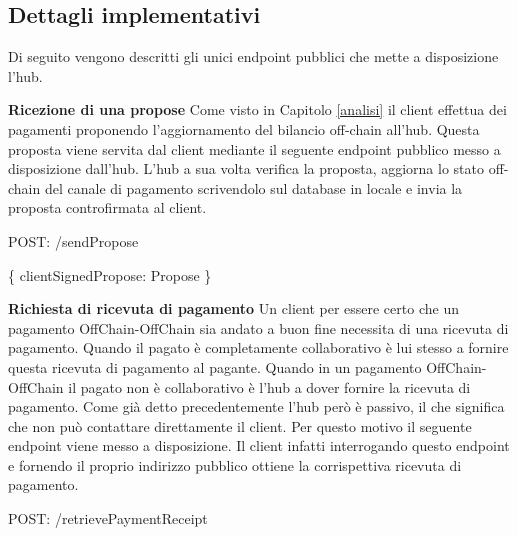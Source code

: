 \documentclass[12pt,italian,]{book}
\newenvironment{Shaded}{}{}
\newcommand{\DataTypeTok}[1]{\textcolor[rgb]{0.56,0.13,0.00}{#1}}
\newcommand{\NormalTok}[1]{#1}
\newcommand{\OperatorTok}[1]{\textcolor[rgb]{0.40,0.40,0.40}{#1}}
\newcommand{\SpecialStringTok}[1]{\textcolor[rgb]{0.73,0.40,0.53}{#1}}
\begin{document}
\hypertarget{dettagli-implementativi-2}{%
\subsection{Dettagli implementativi}\label{dettagli-implementativi-2}}

Di seguito vengono descritti gli unici endpoint pubblici che mette a disposizione l'hub.

\textbf{\textbf{Ricezione di una propose}} Come visto in Capitolo \ref{analisi} il client effettua dei pagamenti proponendo l'aggiornamento del bilancio off-chain all'hub. Questa proposta viene servita dal client mediante il seguente endpoint pubblico messo a disposizione dall'hub. L'hub a sua volta verifica la proposta, aggiorna lo stato off-chain del canale di pagamento scrivendolo sul database in locale e invia la proposta controfirmata al client.

\begin{Shaded}
\begin{Highlighting}[]
\NormalTok{POST}\OperatorTok{:} \SpecialStringTok{/sendPropose}
\end{Highlighting}
\end{Shaded}

\begin{Shaded}
\begin{Highlighting}[]
\OperatorTok{\{}
  \DataTypeTok{clientSignedPropose}\OperatorTok{:}\NormalTok{ Propose}
\OperatorTok{\}}
\end{Highlighting}
\end{Shaded}

\textbf{\textbf{Richiesta di ricevuta di pagamento}} Un client per essere certo che un pagamento OffChain-OffChain sia andato a buon fine necessita di una ricevuta di pagamento. Quando il pagato è completamente collaborativo è lui stesso a fornire questa ricevuta di pagamento al pagante. Quando in un pagamento OffChain-OffChain il pagato non è collaborativo è l'hub a dover fornire la ricevuta di pagamento. Come già detto precedentemente l'hub però è passivo, il che significa che non può contattare direttamente il client. Per questo motivo il seguente endpoint viene messo a disposizione. Il client infatti interrogando questo endpoint e fornendo il proprio indirizzo pubblico ottiene la corrispettiva ricevuta di pagamento.

\begin{Shaded}
\begin{Highlighting}[]
\NormalTok{POST}\OperatorTok{:} \SpecialStringTok{/retrievePaymentReceipt}
\end{Highlighting}
\end{Shaded}
\end{document}

